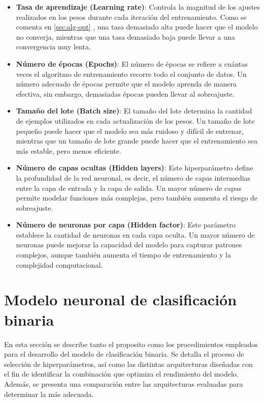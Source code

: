 \begin{itemize}

    \item \textbf{Tasa de aprendizaje (Learning rate)}: Controla la magnitud de los ajustes realizados en los pesos durante cada iteración del entrenamiento. Como se comenta en \ref{sec:alg-opt} , una tasa demasiado alta puede hacer que el modelo no converja, mientras que una tasa demasiado baja puede llevar a una convergencia muy lenta.
    
    \item \textbf{Número de épocas (Epochs)}: El número de épocas se refiere a cuántas veces el algoritmo de entrenamiento recorre todo el conjunto de datos. Un número adecuado de épocas permite que el modelo aprenda de manera efectiva, sin embargo, demasiadas épocas pueden llevar al sobreajuste.
    
    \item \textbf{Tamaño del lote (Batch size)}: El tamaño del lote determina la cantidad de ejemplos utilizados en cada actualización de los pesos. Un tamaño de lote pequeño puede hacer que el modelo sea más ruidoso y difícil de entrenar, mientras que un tamaño de lote grande puede hacer que el entrenamiento sea más estable, pero menos eficiente.
    
    \item \textbf{Número de capas ocultas (Hidden layers)}: Este hiperparámetro define la profundidad de la red neuronal, es decir, el número de capas intermedias entre la capa de entrada y la capa de salida. Un mayor número de capas permite modelar funciones más complejas, pero también aumenta el riesgo de sobreajuste.
    
    \item \textbf{Número de neuronas por capa (Hidden factor)}: Este parámetro establece la cantidad de neuronas en cada capa oculta. Un mayor número de neuronas puede mejorar la capacidad del modelo para capturar patrones complejos, aunque también aumenta el tiempo de entrenamiento y la complejidad computacional.
\end{itemize}



\section{Modelo neuronal de clasificación binaria} \label{sec.modBIN}
En esta sección se describe tanto el proposito como los procedimientos empleados para el desarrollo del modelo de clasificación binaria. Se detalla el proceso de selección de hiperparámetros, así como las distintas arquitecturas diseñadas con el fin de identificar la combinación que optimiza el rendimiento del modelo. Además, se presenta una comparación entre las arquitecturas evaluadas para determinar la más adecuada.

